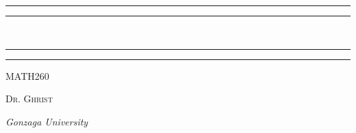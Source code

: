 \begin{titlepage}

  
  \centering %
      
  \scshape %
  
  \vspace*{\baselineskip} %
  
  
  \rule{\textwidth}{1.6pt}\vspace*{-\baselineskip}\vspace*{2pt} %
  \rule{\textwidth}{0.4pt} %
  
  \vspace{0.75\baselineskip} %
  {\huge {}\\} %
  
  \vspace{0.75\baselineskip} %
  
  \rule{\textwidth}{0.4pt}\vspace*{-\baselineskip}\vspace{3.2pt} %
  \rule{\textwidth}{1.6pt} %
  
  \vspace{2\baselineskip} %
  
  
  \LARGE{MATH260} 
  
  \vspace*{3\baselineskip} %
  
  
  
  \vspace{0.5\baselineskip} 
  
  {\scshape   \LARGE Dr. Ghrist\\ } %
  
  \vspace{0.2\baselineskip} 
  
  \textit{\Large Gonzaga University} 
  

\end{titlepage}
